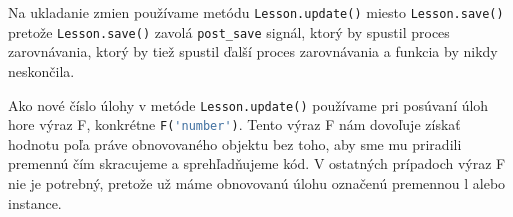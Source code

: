 Na ukladanie zmien používame metódu \lstinline[language=Python]{Lesson.update()} miesto
\lstinline[language=Python]{Lesson.save()} pretože \lstinline[language=Python]{Lesson.save()} zavolá
\lstinline[language=Python]{post_save} signál, ktorý by spustil proces zarovnávania, ktorý by tiež
spustil ďalší proces zarovnávania a funkcia by nikdy neskončila.

Ako nové číslo úlohy v metóde \lstinline[language=Python]{Lesson.update()} používame pri posúvaní úloh hore výraz F,
konkrétne \lstinline[language=Python]{F('number')}. Tento výraz F nám dovoľuje získať hodnotu
poľa práve obnovovaného objektu bez toho, aby sme mu priradili premennú čím skracujeme
a sprehľadňujeme kód. V ostatných prípadoch výraz F nie je potrebný, pretože už máme
obnovovanú úlohu označenú premennou l alebo instance.
